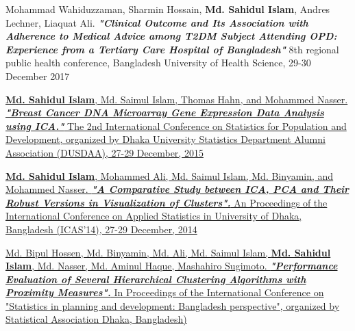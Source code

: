 

\begin{cvparagraph}

\begin{enumerate}[label={[\arabic*]}]
\item {Mohammad Wahiduzzaman, Sharmin Hossain, \textbf{Md. Sahidul Islam}, Andres Lechner, Liaquat Ali. \textit {\textbf {"Clinical Outcome and Its Association with Adherence to Medical Advice among T2DM Subject Attending OPD: Experience from a Tertiary Care Hospital of Bangladesh"}} 8th regional public health conference, Bangladesh University of Health Science, 29-30 December 2017}
		
\item {\href{http://www.dusdaa.org/} {\textbf{ Md. Sahidul Islam}, Md. Saimul Islam, Thomas Hahn, and Mohammed Nasser. \textit {\textbf {"Breast Cancer DNA Microarray Gene Expression Data Analysis using ICA."}} The 2nd International Conference on Statistics for Population and Development, organized by Dhaka University Statistics Department Alumni Association (DUSDAA), 27-29 December, 2015}}
		
\item {\href{http://sites.isrt.ac.bd/icas2014/home}{\textbf {Md. Sahidul Islam}, Mohammed Ali, Md. Saimul Islam, Md. Binyamin, and Mohammed Nasser. \textit {\textbf{"A Comparative Study between ICA, PCA and Their Robust Versions in Visualization of Clusters".}} An Proceedings of the International Conference on Applied Statistics in University of Dhaka, Bangladesh (ICAS'14), 27-29 December, 2014}}
		
\item {\href{http://sites.isrt.ac.bd/icas2014/home} {Md. Bipul Hossen, Md. Binyamin, Md. Ali, Md. Saimul Islam, \textbf {Md. Sahidul Islam}, Md. Nasser, Md. Aminul Haque, Mashahiro Sugimoto. \textbf{\textit {"Performance Evaluation of Several Hierarchical Clustering Algorithms with Proximity Measures".}} In Proceedings of the International Conference on "Statistics in planning and development: Bangladesh perspective", organized by Statistical Association Dhaka, Bangladesh)}}
	
\end{enumerate}

\end{cvparagraph}
